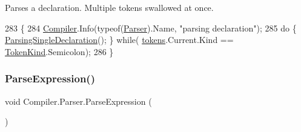 Parses a declaration. Multiple tokens swallowed at once. 
\begin{DoxyCode}
283                                                       \{
284                         \mbox{\hyperlink{namespace_compiler}{Compiler}}.Info(typeof(\mbox{\hyperlink{class_compiler_1_1_parser_a450e11452db3f91ff866fc1e36ebc79d}{Parser}}).Name, \textcolor{stringliteral}{"parsing declaration"});
285                         \textcolor{keywordflow}{do} \{ \mbox{\hyperlink{class_compiler_1_1_parser_ad0b467a2202c311d465a11165f602216}{ParsingSingleDeclaration}}(); \} \textcolor{keywordflow}{while}(
      \mbox{\hyperlink{class_compiler_1_1_parser_a4db075175c853a197c7b8db7d787a0a5}{tokens}}.Current.Kind == \mbox{\hyperlink{namespace_compiler_a57929962f25004759596fc3f13cf563c}{TokenKind}}.Semicolon);
286                     \}
\end{DoxyCode}
\mbox{\label{class_compiler_1_1_parser_a8c6c2073d17ac572fb9117892cbf5aa1}} 
\subsubsection{\texorpdfstring{Parse\+Expression()}{ParseExpression()}}
{\footnotesize\ttfamily void Compiler.\+Parser.\+Parse\+Expression (\begin{DoxyParamCaption}{ }\end{DoxyParamCaption})\hspace{0.3cm}{\ttfamily [protected]}}

